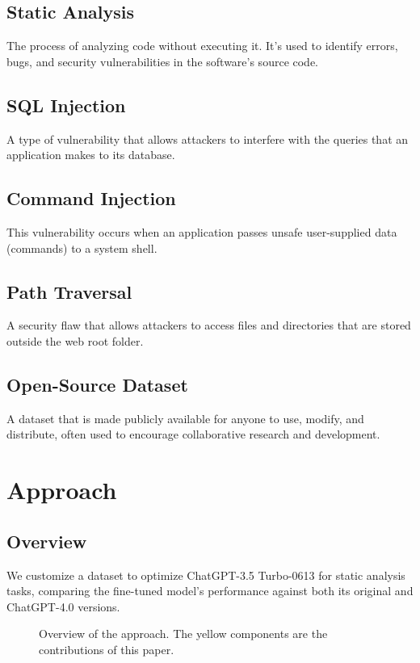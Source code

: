 \documentclass[acmsmall]{acmart}
\begin{document}
\subsection{Static Analysis}
The process of analyzing code without executing it. It's used to identify errors, bugs, and security vulnerabilities in the software's source code.

\subsection{SQL Injection}
A type of vulnerability that allows attackers to interfere with the queries that an application makes to its database.

\subsection{Command Injection}
This vulnerability occurs when an application passes unsafe user-supplied data (commands) to a system shell.

\subsection{Path Traversal}
A security flaw that allows attackers to access files and directories that are stored outside the web root folder.

\subsection{Open-Source Dataset}
A dataset that is made publicly available for anyone to use, modify, and distribute, often used to encourage collaborative research and development.

\section{Approach}

\subsection{Overview}

We customize a dataset to optimize ChatGPT-3.5 Turbo-0613 for static analysis tasks, comparing the fine-tuned model's performance against both its original and ChatGPT-4.0 versions.

\begin{figure}[htp] 
\caption{Overview of the approach. The yellow components
are the contributions of this paper.}
\end{figure}
\end{document}
